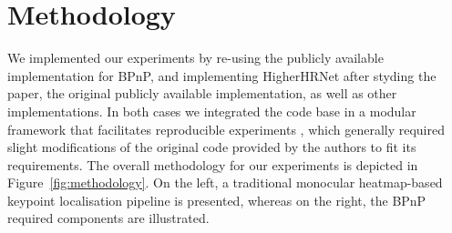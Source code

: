 


\section{Methodology}
We implemented our experiments by re-using the publicly available implementation for BPnP, and implementing HigherHRNet after styding the paper, the original publicly available implementation, as well as other implementations.
In both cases we integrated the code base in a modular framework that facilitates reproducible experiments \cite{moai}, which generally required slight modifications of the original code provided by the authors to fit its requirements. 
The overall methodology for our experiments is depicted in Figure~\ref{fig:methodology}.
On the left, a traditional monocular heatmap-based keypoint localisation pipeline is presented, whereas on the right, the BPnP required components are illustrated.

